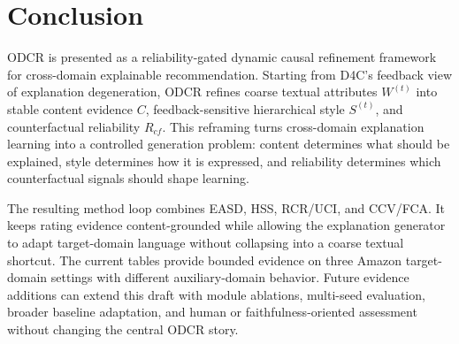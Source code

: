 \section{Conclusion}

ODCR is presented as a reliability-gated dynamic causal refinement framework
for cross-domain explainable recommendation. Starting from D4C's feedback view
of explanation degeneration, ODCR refines coarse textual attributes
\(W^{(t)}\) into stable content evidence \(C\), feedback-sensitive hierarchical
style \(S^{(t)}\), and counterfactual reliability \(R_{cf}\). This reframing
turns cross-domain explanation learning into a controlled generation problem:
content determines what should be explained, style determines how it is
expressed, and reliability determines which counterfactual signals should
shape learning.

The resulting method loop combines EASD, HSS, RCR/UCI, and CCV/FCA. It keeps
rating evidence content-grounded while allowing the explanation generator to
adapt target-domain language without collapsing into a coarse textual shortcut.
The current tables provide bounded evidence on three Amazon target-domain
settings with different auxiliary-domain behavior. Future evidence additions
can extend this draft with module ablations, multi-seed evaluation, broader
baseline adaptation, and human or faithfulness-oriented assessment without
changing the central ODCR story.
